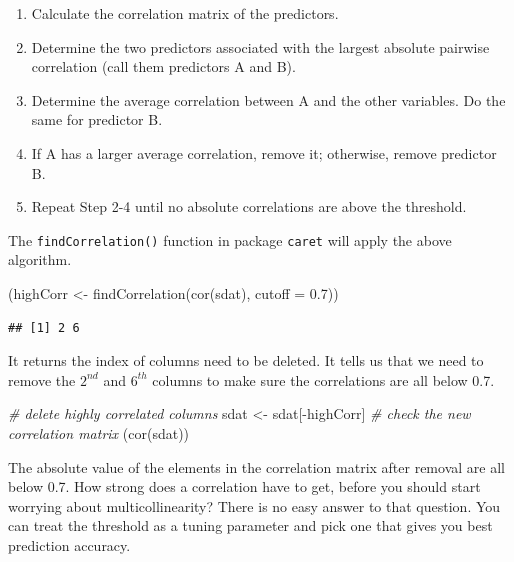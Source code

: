\documentclass[
  12pt,
]{krantz}
\makeatletter
\newenvironment{Shaded}{\begin{snugshade}}{\end{snugshade}}
\newcommand{\AttributeTok}[1]{\textcolor[rgb]{0.61,0.61,0.61}{#1}}
\newcommand{\CommentTok}[1]{\textcolor[rgb]{0.37,0.37,0.37}{\textit{#1}}}
\newcommand{\FloatTok}[1]{\textcolor[rgb]{0.06,0.06,0.06}{#1}}
\newcommand{\FunctionTok}[1]{\textcolor[rgb]{0,0,0}{#1}}
\newcommand{\NormalTok}[1]{#1}
\newcommand{\OtherTok}[1]{\textcolor[rgb]{0.37,0.37,0.37}{#1}}
\newcommand{\SpecialCharTok}[1]{\textcolor[rgb]{0,0,0}{#1}}
\providecommand{\tightlist}{%
  \setlength{\itemsep}{0pt}\setlength{\parskip}{0pt}}
\renewenvironment{quote}{\begin{VF}}{\end{VF}}
\newenvironment{kframe}{%
\medskip{}
\setlength{\fboxsep}{.8em}
 \def\at@end@of@kframe{}%
 \ifinner\ifhmode%
  \def\at@end@of@kframe{\end{minipage}}%
  \begin{minipage}{\columnwidth}%
 \fi\fi%
 \def\FrameCommand##1{\hskip\@totalleftmargin \hskip-\fboxsep
 \colorbox{shadecolor}{##1}\hskip-\fboxsep
     \hskip-\linewidth \hskip-\@totalleftmargin \hskip\columnwidth}%
 \MakeFramed {\advance\hsize-\width
   \@totalleftmargin\z@ \linewidth\hsize
   \@setminipage}}%
 {\par\unskip\endMakeFramed%
 \at@end@of@kframe}
\renewenvironment{Shaded}{\begin{kframe}}{\end{kframe}}
\makeatother
\begin{document}
\begin{quote}
\begin{enumerate}
\def\labelenumi{(\arabic{enumi})}
\tightlist
\item
  Calculate the correlation matrix of the predictors.
\item
  Determine the two predictors associated with the largest absolute pairwise correlation (call them predictors A and B).
\item
  Determine the average correlation between A and the other variables. Do the same for predictor B.
\item
  If A has a larger average correlation, remove it; otherwise, remove predictor B.
\item
  Repeat Step 2-4 until no absolute correlations are above the threshold.
\end{enumerate}
\end{quote}

The \texttt{findCorrelation()} function in package \texttt{caret} will apply the above algorithm.

\begin{Shaded}
\begin{Highlighting}[]
\NormalTok{(highCorr }\OtherTok{\textless{}{-}} \FunctionTok{findCorrelation}\NormalTok{(}\FunctionTok{cor}\NormalTok{(sdat), }\AttributeTok{cutoff =} \FloatTok{0.7}\NormalTok{))}
\end{Highlighting}
\end{Shaded}

\begin{verbatim}
## [1] 2 6
\end{verbatim}

It returns the index of columns need to be deleted. It tells us that we need to remove the \(2^{nd}\) and \(6^{th}\) columns to make sure the correlations are all below 0.7.

\begin{Shaded}
\begin{Highlighting}[]
\CommentTok{\# delete highly correlated columns}
\NormalTok{sdat }\OtherTok{\textless{}{-}}\NormalTok{ sdat[}\SpecialCharTok{{-}}\NormalTok{highCorr]}
\CommentTok{\# check the new correlation matrix}
\NormalTok{(}\FunctionTok{cor}\NormalTok{(sdat))}
\end{Highlighting}
\end{Shaded}

The absolute value of the elements in the correlation matrix after removal are all below 0.7. How strong does a correlation have to get, before you should start worrying about multicollinearity? There is no easy answer to that question. You can treat the threshold as a tuning parameter and pick one that gives you best prediction accuracy.
\end{document}
